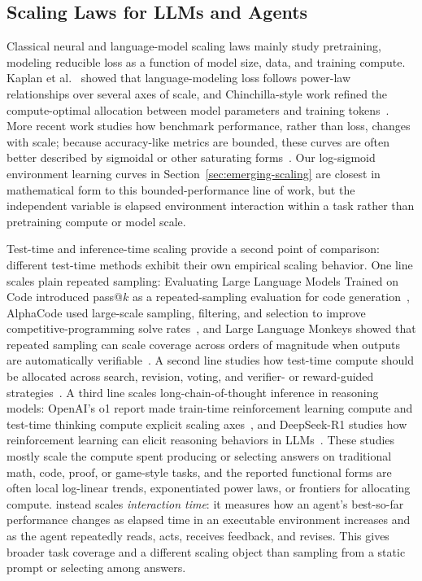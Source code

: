 \subsection{Scaling Laws for LLMs and Agents}
\label{sec:additional-related-work-scaling-laws}

Classical neural and language-model scaling laws mainly study pretraining, modeling reducible loss as a function of model size, data, and training compute. Kaplan et al.~\cite{kaplan2020scaling} showed that language-modeling loss follows power-law relationships over several axes of scale, and Chinchilla-style work refined the compute-optimal allocation between model parameters and training tokens~\cite{hoffmann2022training}. More recent work studies how benchmark performance, rather than loss, changes with scale; because accuracy-like metrics are bounded, these curves are often better described by sigmoidal or other saturating forms~\cite{owen2024predictable,ruan2024observational,bhagia2024taskscaling,zhang2026prescriptive}. Our log-sigmoid environment learning curves in Section~\ref{sec:emerging-scaling} are closest in mathematical form to this bounded-performance line of work, but the independent variable is elapsed environment interaction within a task rather than pretraining compute or model scale.

Test-time and inference-time scaling provide a second point of comparison: different test-time methods exhibit their own empirical scaling behavior. One line scales plain repeated sampling: Evaluating Large Language Models Trained on Code introduced pass@\(k\) as a repeated-sampling evaluation for code generation~\cite{chen2021humaneval}, AlphaCode used large-scale sampling, filtering, and selection to improve competitive-programming solve rates~\cite{li2022alphacode}, and Large Language Monkeys showed that repeated sampling can scale coverage across orders of magnitude when outputs are automatically verifiable~\cite{brown2024largelanguagemonkeys}. A second line studies how test-time compute should be allocated across search, revision, voting, and verifier- or reward-guided strategies~\cite{snell2024testtime,wu2024inference}. A third line scales long-chain-of-thought inference in reasoning models: OpenAI's o1 report made train-time reinforcement learning compute and test-time thinking compute explicit scaling axes~\cite{openai2024learningreason}, and DeepSeek-R1 studies how reinforcement learning can elicit reasoning behaviors in LLMs~\cite{deepseekai2025deepseekr1}. These studies mostly scale the compute spent producing or selecting answers on traditional math, code, proof, or game-style tasks, and the reported functional forms are often local log-linear trends, exponentiated power laws, or frontiers for allocating compute. \benchmark{} instead scales \emph{interaction time}: it measures how an agent's best-so-far performance changes as elapsed time in an executable environment increases and as the agent repeatedly reads, acts, receives feedback, and revises. This gives broader task coverage and a different scaling object than sampling from a static prompt or selecting among answers.


